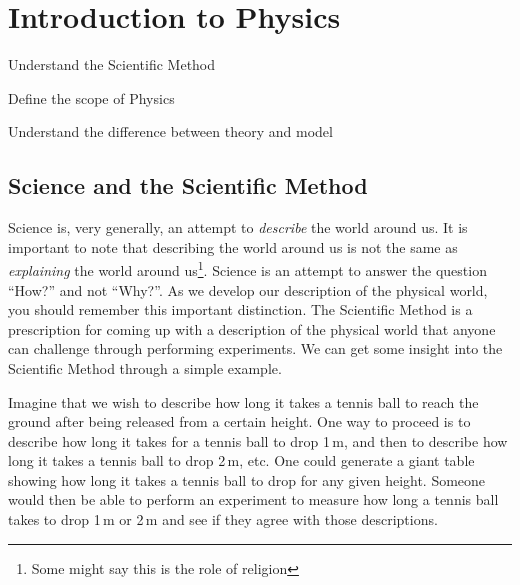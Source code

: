 %
\chapter{Introduction to Physics}
\label{chap:Intro}

\begin{learningObjectives}
\item Understand the Scientific Method
\item Define the scope of Physics
\item Understand the difference between theory and model
\end{learningObjectives}

\section{Science and the Scientific Method}
Science is, very generally, an attempt to \textit{describe} the world around us. It is important to note that describing the world around us is not the same as \textit{explaining} the world around us\footnote{Some might say this is the role of religion}. Science is an attempt to answer the question ``How?'' and not ``Why?''. As we develop our description of the physical world, you should remember this important distinction. The Scientific Method is a prescription for coming up with a description of the physical world that anyone can challenge through performing experiments. We can get some insight into the Scientific Method through a simple example. 

Imagine that we wish to describe how long it takes a tennis ball to reach the ground after being released from a certain height. One way to proceed is to describe how long it takes for a tennis ball to drop 1\,m, and then to describe how long it takes a tennis ball to drop 2\,m, etc. One could generate a giant table showing how long it takes a tennis ball to drop for any given height. Someone would then be able to perform an experiment to measure how long a tennis ball takes to drop 1\,m or 2\,m and see if they agree with those descriptions.

